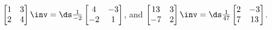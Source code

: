 \begin{example} 
$
\begin{bmatrix}
 1 & 3 \\
 2 & 4
\end{bmatrix}\inv =
\ds\frac{1}{-2}\begin{bmatrix}
 4 & -3 \\
 -2 & 1
\end{bmatrix}
$, and $
\begin{bmatrix}
 13 & 3 \\
 -7 & 2
\end{bmatrix}\inv
=
\ds\frac{1}{47}\begin{bmatrix}
 2 & -3 \\
 7 & 13
\end{bmatrix}
$.
\end{example}




